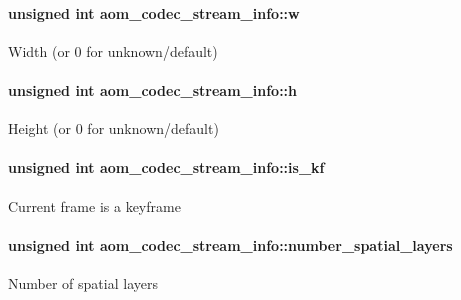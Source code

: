 \paragraph[{\texorpdfstring{w}{w}}]{\setlength{\rightskip}{0pt plus 5cm}unsigned int aom\+\_\+codec\+\_\+stream\+\_\+info\+::w}\hypertarget{structaom__codec__stream__info_add84a2752fefd706f893fbc41ba6b9f2}{}\label{structaom__codec__stream__info_add84a2752fefd706f893fbc41ba6b9f2}
Width (or 0 for unknown/default) 
\paragraph[{\texorpdfstring{h}{h}}]{\setlength{\rightskip}{0pt plus 5cm}unsigned int aom\+\_\+codec\+\_\+stream\+\_\+info\+::h}\hypertarget{structaom__codec__stream__info_a2f1c33e3b980b274176545340b474e34}{}\label{structaom__codec__stream__info_a2f1c33e3b980b274176545340b474e34}
Height (or 0 for unknown/default) 
\paragraph[{\texorpdfstring{is\+\_\+kf}{is_kf}}]{\setlength{\rightskip}{0pt plus 5cm}unsigned int aom\+\_\+codec\+\_\+stream\+\_\+info\+::is\+\_\+kf}\hypertarget{structaom__codec__stream__info_a0264e63c333ff05b2afd6df478ed807c}{}\label{structaom__codec__stream__info_a0264e63c333ff05b2afd6df478ed807c}
Current frame is a keyframe 
\paragraph[{\texorpdfstring{number\+\_\+spatial\+\_\+layers}{number_spatial_layers}}]{\setlength{\rightskip}{0pt plus 5cm}unsigned int aom\+\_\+codec\+\_\+stream\+\_\+info\+::number\+\_\+spatial\+\_\+layers}\hypertarget{structaom__codec__stream__info_af7487a0e56b6919f94a7e426abd44eac}{}\label{structaom__codec__stream__info_af7487a0e56b6919f94a7e426abd44eac}
Number of spatial layers 
